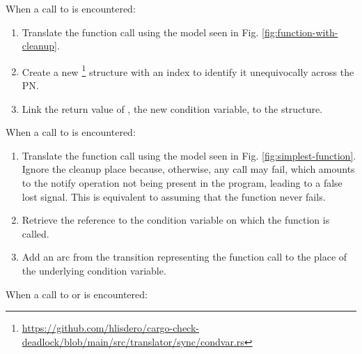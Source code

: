 When a call to  is encountered:

\begin{enumerate}
      \item Translate the function call using the model seen in Fig. \ref{fig:function-with-cleanup}.
      \item Create a new \footnote{\url{https://github.com/hlisdero/cargo-check-deadlock/blob/main/src/translator/sync/condvar.rs}}
            structure with an index to identify it unequivocally across the \acrshort{PN}.
      \item Link the return value of ,
            the new condition variable, to the  structure.
\end{enumerate}

When a call to  is encountered:

\begin{enumerate}
      \item Translate the function call using the model seen in Fig. \ref{fig:simplest-function}.
            Ignore the cleanup place because, otherwise, any call may fail,
            which amounts to the notify operation not being present in the program,
            leading to a false lost signal.
            This is equivalent to assuming that the  function never fails.
      \item Retrieve the  reference to the condition variable
            on which the function is called.
      \item Add an arc from the transition representing the function call
            to the  place of the underlying condition variable.
\end{enumerate}

When a call to 
or  is encountered:

